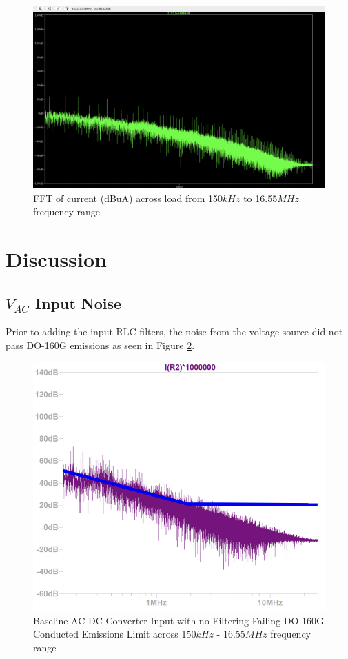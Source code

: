 \documentclass[conference]{IEEEtran}
\begin{document}
\begin{figure}[htb]
    \centering
    \includegraphics[width=1.0\linewidth]{load_fft_150kHz_16MHz.png}
    \caption{FFT of current (dBuA) across load from 150$kHz$ to 16.55$MHz$ frequency range}
    \label{fig:load_fft_150kHz_16MHz_waveform}
\end{figure}

\section{Discussion}
\subsection{$V_{AC}$ Input Noise}
Prior to adding the input RLC filters, the noise from the voltage source did not pass DO-160G emissions as seen in Figure \ref{fig:no_input_filter_top_level_waveform}. 

\begin{figure}[htp]
    \centering
    \includegraphics[width=1.0\linewidth]{no_input_filter_emissions_limit.png}
    \caption{Baseline AC-DC Converter Input with no Filtering Failing DO-160G Conducted Emissions Limit across 150$kHz$ - 16.55$MHz$ frequency range}
    \label{fig:no_input_filter_top_level_waveform}
\end{figure}
\end{document}
